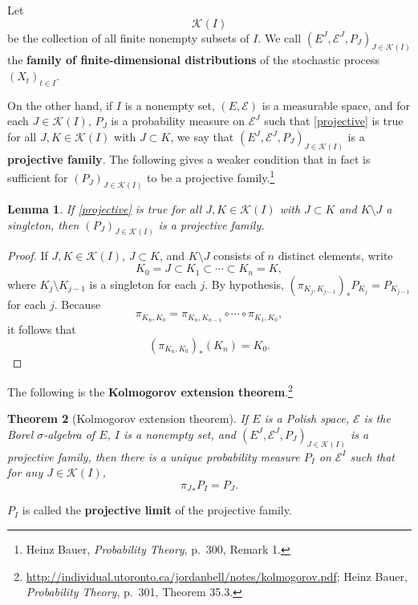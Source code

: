 \documentclass{article}
\newtheorem{theorem}{Theorem}
\newtheorem{lemma}[theorem]{Lemma}
\theoremstyle{definition}
\begin{document}
Let
\[
\mathscr{K}(I)
\]
 be the collection of all finite nonempty subsets of $I$. We call
$(E^J,\mathscr{E}^J,P_J)_{J \in \mathscr{K}(I)}$ the \textbf{family of finite-dimensional distributions}
of the stochastic process $(X_t)_{t \in I}$. 

On the other hand, if $I$ is a nonempty set, $(E,\mathscr{E})$ is a measurable space,
and for each $J \in \mathscr{K}(I)$, $P_J$ is a probability measure
on $\mathscr{E}^J$ such that
\eqref{projective} is true for all $J, K \in \mathscr{K}(I)$ with $J \subset K$, we
say that $(E^J,\mathscr{E}^J,P_J)_{J \in \mathscr{K}(I)}$ is a \textbf{projective family}.  
The following gives a weaker condition that in fact is sufficient  for  $(P_J)_{J \in \mathscr{K}(I)}$ to be a projective family.\footnote{Heinz Bauer,
{\em Probability Theory}, p.~300, Remark 1.}

\begin{lemma}
If \eqref{projective} is true for all $J, K \in \mathscr{K}(I)$ with $J \subset K$ and
$K \setminus J$ a singleton, then $(P_J)_{J \in \mathscr{K}(I)}$ is a projective family.
\end{lemma}
\begin{proof}
If $J,K \in \mathscr{K}(I)$, $J \subset K$, and $K \setminus J$ consists of $n$ distinct elements, write
\[
K_0 = J \subset K_1  \subset \cdots \subset K_n = K,
\]
where $K_j \setminus K_{j-1}$ is a singleton for each $j$. By  hypothesis,
$(\pi_{K_j, K_{j-1}})_* P_{K_j} = P_{K_{j-1}}$ for each $j$.
Because
\[
\pi_{K_n,K_0} = \pi_{K_n,K_{n-1}} \circ \cdots \circ \pi_{K_1,K_0},
\]
it follows that
\[
(\pi_{K_n,K_0})_*(K_n) = K_0.
\]
\end{proof}


The following is the \textbf{Kolmogorov extension theorem}.\footnote{\url{http://individual.utoronto.ca/jordanbell/notes/kolmogorov.pdf};
Heinz Bauer, {\em Probability Theory}, p.~301, Theorem 35.3.}

\begin{theorem}[Kolmogorov extension theorem]
If $E$ is a Polish space, $\mathscr{E}$ is the Borel $\sigma$-algebra of $E$, $I$ is a nonempty set, and
$(E^J,\mathscr{E}^J,P_J)_{J \in \mathscr{K}(I)}$ is a projective family,
then there is a unique probability measure
$P_I$ on $\mathscr{E}^I$ such that for any $J \in \mathscr{K}(I)$,
\[
{\pi_J}_*P_I = P_J.
\]
\end{theorem}

$P_I$ is called the \textbf{projective limit} of the projective family.
\end{document}
